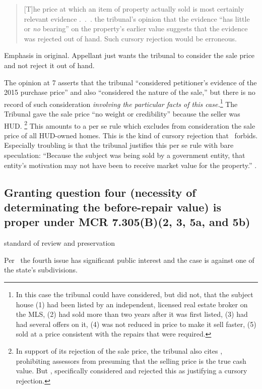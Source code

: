 \documentclass[12pt,\documentclassflag]{michiganCourtOfAppealsBrief}
\begin{document}
\begin{quotation}
  [T]he price at which an item of
  property actually sold is most certainly relevant evidence .~.~.
  the tribunal's opinion that the evidence ``has little or \emph{no}
bearing'' on the property's earlier value suggests that the evidence was rejected out of hand. Such cursory rejection would be erroneous.
\end{quotation}
Emphasis in original. Appellant just wants the tribunal to consider the sale price and not reject it out of hand.

The opinion at 7 asserts that the tribunal ``considered petitioner's evidence of the 2015 purchase price'' and also ``considered the nature of the sale,'' but there is no record of such consideration \emph{involving the particular facts of this case.}\footnote{In this case the tribunal could have considered, but did not, that the subject house (1) had been listed by an independent, licensed real estate broker on the MLS, (2) had sold more than two years after it was first listed, (3) had had several offers on it, (4) was not reduced in price to make it sell faster, (5) sold at a price consistent with the repairs that were required.}
The Tribunal gave the sale price ``no weight or credibility'' because the seller was HUD.%
\footnote{In support of its rejection of the sale price, the tribunal also cites \cite[s]{MCL 211.27(6)}, prohibiting assessors from presuming that the selling price is the true cash value. But , specifically considered and rejected this as justifying a cursory rejection.}
This amounts to a per se rule which excludes from consideration the sale price of all HUD-owned homes. This is the kind of cursory rejection that \cite[s]{Jones & Laughlin}\ forbids. Especially troubling is that the tribunal justifies this per se rule with bare speculation: ``Because the subject was being sold by a government entity, that entity's motivation may
not have been to receive market value for the property.'' \reconsiderationDenied[2].

\subsection{Granting question four (necessity of determinating the before-repair value) is proper under MCR 7.305(B)(2, 3, 5a, and 5b)}

standard of review and preservation

Per \cite{MCR 7.305(B)(2)}\ the fourth issue has significant public interest and the case is against one of the state's subdivisions.
\end{document}
